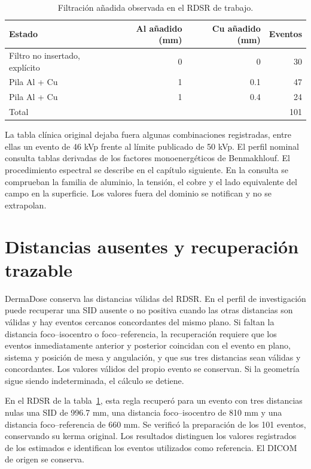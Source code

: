 \begin{table}[htbp]\centering
\caption{Filtración añadida observada en el RDSR de trabajo.}\label{tab:groups}
\begin{tabular}{lrrr}\toprule
Estado & Al añadido (mm) & Cu añadido (mm) & Eventos\\\midrule
Filtro no insertado, explícito & 0 & 0 & 30\\
Pila Al + Cu & 1 & \num{0.1} & 47\\
Pila Al + Cu & 1 & \num{0.4} & 24\\\midrule
Total & & & 101\\\bottomrule
\end{tabular}
\end{table}

La tabla clínica original dejaba fuera algunas combinaciones registradas, entre ellas un evento de 46 kVp frente al límite publicado de 50 kVp. El perfil nominal consulta tablas derivadas de los factores monoenergéticos de Benmakhlouf. El procedimiento espectral se describe en el capítulo siguiente. En la consulta se comprueban la familia de aluminio, la tensión, el cobre y el lado equivalente del campo en la superficie. Los valores fuera del dominio se notifican y no se extrapolan.

\section{Distancias ausentes y recuperación trazable}
DermaDose conserva las distancias válidas del RDSR. En el perfil de investigación puede recuperar una SID ausente o no positiva cuando las otras distancias son válidas y hay eventos cercanos concordantes del mismo plano. Si faltan la distancia foco--isocentro o foco--referencia, la recuperación requiere que los eventos inmediatamente anterior y posterior coincidan con el evento en plano, sistema y posición de mesa y angulación, y que sus tres distancias sean válidas y concordantes. Los valores válidos del propio evento se conservan. Si la geometría sigue siendo indeterminada, el cálculo se detiene.

En el RDSR de la tabla~\ref{tab:groups}, esta regla recuperó para un evento con tres distancias nulas una SID de \num{996.7} mm, una distancia foco--isocentro de 810 mm y una distancia foco--referencia de 660 mm. Se verificó la preparación de los 101 eventos, conservando su kerma original. Los resultados distinguen los valores registrados de los estimados e identifican los eventos utilizados como referencia. El DICOM de origen se conserva.

